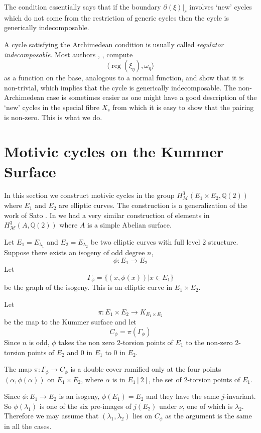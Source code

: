 \documentclass[11pt,a4paper]{article}
\newcommand {\Q}{{\mathds Q}}
\newcommand {\M}{{\mathcal M}}
\newcommand {\lb}{{\lambda}}
\newcommand {\KE}{{K_{E_1 \times E_2}}}
\def\reg{\operatorname{reg}}
\begin{document}
The condition essentially says that if the boundary $\partial(\xi)|_s$ involves `new' cycles which do not come from the restriction of generic cycles then the cycle is generically indecomposable.   


A cycle satisfying the  Archimedean condition is usually called {\em regulator indecomposable}. Most authors \cite{chle}, \cite{sato}, \cite{coll} compute 
%
$$\langle\reg(\xi_{\eta}),\omega_{\eta} \rangle$$
%
as a function on the base, analogous to a normal function, and show that it is non-trivial, which implies that the cycle is generically indecomposable. The non-Archimedean case is sometimes easier as one might have a good description of the `new' cycles in the special fibre $X_s$ from which it is easy to show that the pairing is non-zero. This is what we do. 

\section{Motivic cycles on the Kummer Surface}



In this section we construct motivic cycles in the group $H^3_{\M}(E_1 \times E_2,\Q(2))$ where $E_1$ and $E_2$ are elliptic curves. The construction is a generalization of the work of Sato \cite{sato}. In \cite{sree-simple} we had a very  similar construction of elements in  $H^3_{\M}(A,\Q(2))$ where $A$ is a simple Abelian surface. 




\label{sec-mot-cycles-on-Km-surfaces}


Let $E_1=E_{\lb_1}$ and $E_2=E_{\lb_2}$ be two elliptic curves with full level $2$ structure. Suppose there exists an isogeny of odd degree $n$,  
%
$$\phi:E_1 \rightarrow E_2$$
%
Let 
%
$$\Gamma_{\phi}=\{(x,\phi(x))|x \in E_1\}$$ 
%
be the graph of the isogeny. This is an elliptic curve in $E_1 \times E_2$. 


Let 
%
$$\pi:E_1 \times E_2 \longrightarrow \KE$$
%
be the map to the Kummer surface and let 
%
$$C_{\phi}=\pi(\Gamma_{\phi})$$
%
Since $n$ is odd, $\phi$ takes the non zero 2-torsion points of $E_1$ to the non-zero 2-torsion points of $E_2$ and $0$ in $E_1$ to $0$ in $E_2$. 

The map $\pi:\Gamma_{\phi} \longrightarrow C_{\phi}$ is a double cover ramified only at the four points $(\alpha,\phi(\alpha))$ on $E_1 \times E_2$,  where $\alpha$ is in $E_1[2]$, the set of 2-torsion points of $E_1$. 

Since $\phi:E_1 \rightarrow E_2$ is an isogeny, $\phi(E_1)=E_2$ and they have the same $j$-invariant. So $\phi(\lambda_1)$ is one of the six pre-images of $j(E_2)$ under $\nu$, one of which is $\lambda_2$. Therefore we  may  assume that $(\lb_1,\lb_2)$ lies on $C_{\phi}$ as the argument is the same in all the cases. 
\end{document}
